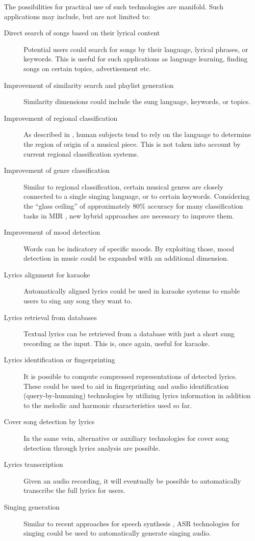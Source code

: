 The possibilities for practical use of such technologies are manifold. Such applications may include, but are not limited to:
\begin{description}
\item[Direct search of songs based on their lyrical content] Potential users could search for songs by their language, lyrical phrases, or keywords. This is useful for such applications as language learning, finding songs on certain topics, advertisement etc.
\item[Improvement of similarity search and playlist generation] Similarity dimensions could include the sung language, keywords, or topics.
 \item[Improvement of regional classification] As described in \cite{kruspe11}, human subjects tend to rely on the language to determine the region of origin of a musical piece. This is not taken into account by current regional classification systems.
 \item[Improvement of genre classification] Similar to regional classification, certain musical genres are closely connected to a single singing language, or to certain keywords. Considering the ``glass ceiling'' of approximately 80\% accuracy for many classification tasks in MIR \cite{glass_ceiling}, new hybrid approaches are necessary to improve them.
 \item[Improvement of mood detection] Words can be indicatory of specific moods. By exploiting those, mood detection in music could be expanded with an additional dimension.
 \item[Lyrics alignment for karaoke] Automatically aligned lyrics could be used in karaoke systems to enable users to sing any song they want to.
\item[Lyrics retrieval from databases] Textual lyrics can be retrieved from a database with just a short sung recording as the input. This is, once again, useful for karaoke. 
\item[Lyrics identification or fingerprinting] It is possible to compute compressed representations of detected lyrics. These could be used to aid in fingerprinting and audio identification (query-by-humming) technologies by utilizing lyrics information in addition to the melodic and harmonic characteristics used so far. 
\item[Cover song detection by lyrics] In the same vein, alternative or auxiliary technologies for cover song detection through lyrics analysis are possible.
\item[Lyrics transcription] Given an audio recording, it will eventually be possible to automatically transcribe the full lyrics for users.
\item[Singing generation] Similar to recent approaches for speech synthesis \cite{wavenet}, ASR technologies for singing could be used to automatically generate singing audio.
\end{description}


